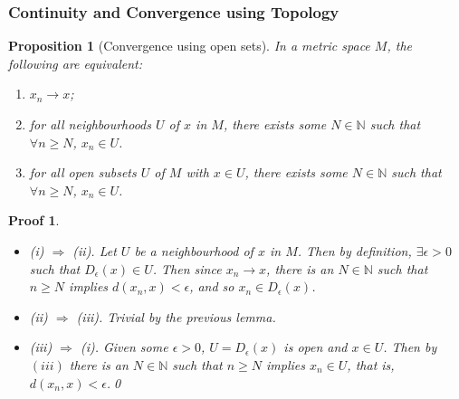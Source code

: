 \documentclass{article}
\theoremstyle{plain}\theoremheaderfont{\normalfont\itshape}\theorembodyfont{\rmfamily}\theoremseparator{.}\newtheorem*{rem}{Remark}\newtheorem*{ex}{Example}\newtheorem*{proof}{Proof}\newtheorem*{altp}{Alternative proof}
\theoremstyle{plain}\theoremheaderfont{\normalfont\bfseries}\theorembodyfont{\rmfamily}\theoremseparator{.}\newtheorem{thm}{Theorem}[section]\newtheorem{lem}[thm]{Lemma}\newtheorem{prop}[thm]{Proposition}\newtheorem*{cor}{Corollary}\newtheorem{defn}[thm]{Definition}\newtheorem{clm}[thm]{Claim}\newtheorem{clminproof}{Claim}
\theoremstyle{break}\theoremheaderfont{\normalfont\itshape}\theorembodyfont{\rmfamily}\theoremseparator{.\medskip}\newtheorem*{proofskip}{Proof}\newtheorem*{exs}{Examples}\newtheorem*{rems}{Remarks}
\theoremstyle{break}\theoremheaderfont{\normalfont\bfseries}\theorembodyfont{\rmfamily}\theoremseparator{.\medskip}\newtheorem{lemskip}[thm]{Lemma}\newtheorem{defnskip}[thm]{Definition}\newtheorem{propskip}[thm]{Proposition}\newtheorem{thmskip}[thm]{Theorem}
\newcommand{\qed}{\hfill\ensuremath{\Box}}
\begin{document}
    \subsubsection{Continuity and Convergence using Topology}
    \begin{prop}[Convergence using open sets]
        In a metric space \(M\), the following are equivalent:
        \begin{enumerate}[label=(\roman*),topsep=0pt]
            \item \(x_n\to x\);
            \item for all neighbourhoods \(U\) of \(x\) in \(M\), there exists some \(N\in\mathbb{N}\) such that \(\forall n\ge N\), \(x_n\in U\).
            \item for all open subsets \(U\) of \(M\) with \(x\in U\), there exists some \(N\in\mathbb{N}\) such that \(\forall n\ge N\), \(x_n\in U\).
        \end{enumerate}
    \end{prop}
    \begin{proofskip}
        \begin{itemize}[topsep=0pt]
            \item (i) \(\Rightarrow\) (ii). Let \(U\) be a neighbourhood of \(x\) in \(M\). Then by definition, \(\exists\epsilon>0\) such that \(D_\epsilon(x)\in U\). Then since \(x_n\to x\), there is an \(N\in\mathbb{N}\) such that \(n\ge N\) implies \(d(x_n,x)<\epsilon\), and so \(x_n\in D_\epsilon(x)\).
            \item (ii) \(\Rightarrow\) (iii). Trivial by the previous lemma.
            \item (iii) \(\Rightarrow\) (i). Given some \(\epsilon>0\), \(U=D_\epsilon(x)\) is open and \(x\in U\). Then by \((iii)\) there is an \(N\in\mathbb{N}\) such that \(n\ge N\) implies \(x_n\in U\), that is, \(d(x_n,x)<\epsilon\).\qed
        \end{itemize}
    \end{proofskip}
\end{document}
